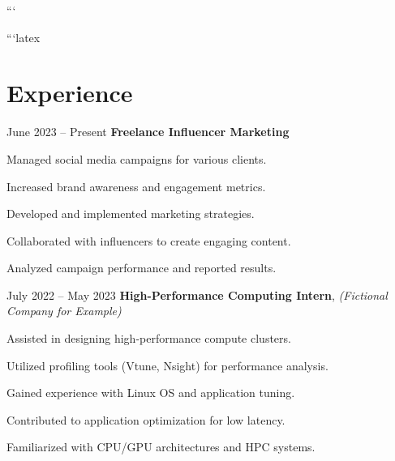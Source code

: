 ```

```latex
\section{Experience}
\begin{twocolentry}{
    June 2023 – Present
}
    \textbf{Freelance Influencer Marketing}
\end{twocolentry}
\vspace{0.10 cm}
\begin{onecolentry}
    \begin{highlights}
        \item Managed social media campaigns for various clients.
        \item Increased brand awareness and engagement metrics.
        \item Developed and implemented marketing strategies.
        \item Collaborated with influencers to create engaging content.
        \item Analyzed campaign performance and reported results.
    \end{highlights}
\end{onecolentry}
\vspace{0.2 cm}
\begin{twocolentry}{
    July 2022 – May 2023
}
    \textbf{High-Performance Computing Intern},  \textit{(Fictional Company for Example)}
\end{twocolentry}
\vspace{0.10 cm}
\begin{onecolentry}
    \begin{highlights}
        \item Assisted in designing high-performance compute clusters.
        \item Utilized profiling tools (Vtune, Nsight) for performance analysis.
        \item Gained experience with Linux OS and application tuning.
        \item Contributed to  application optimization for low latency.
        \item Familiarized with CPU/GPU architectures and HPC systems.
    \end{highlights}
\end{onecolentry}

